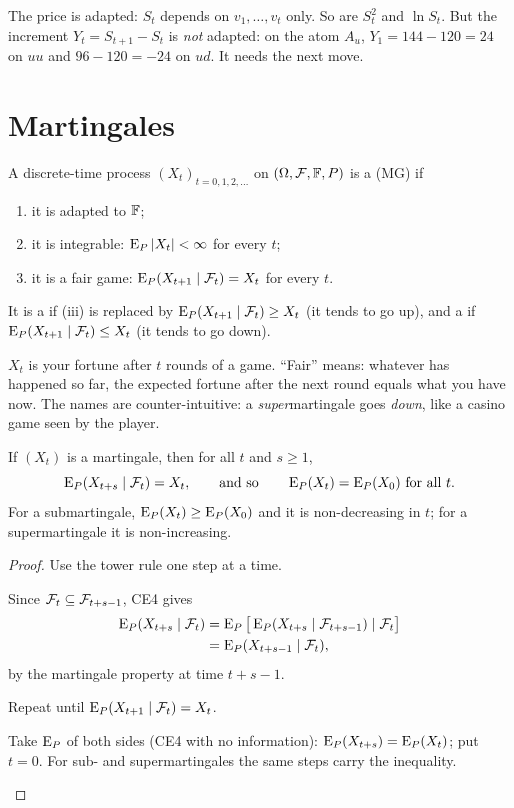The price is adapted: $S_t$ depends on $v_1,\dots,v_t$ only. So are $S_t^2$ and $\ln S_t$. But the increment $Y_t=S_{t+1}-S_t$ is \emph{not} adapted: on the atom $A_u$, $Y_1=144-120=24$ on $uu$ and $96-120=-24$ on $ud$. It needs the next move.

\section{Martingales}

\begin{definition}[Martingale]
\label{def:mg}
A discrete-time process $(X_t)_{t=0,1,2,\dots}$ on $(\Omega,\mathcal F,\mathbb F,P)$ is a  (MG) if
\begin{enumerate}[label=(\roman*)]
  \item it is adapted to $\mathbb F$;
  \item it is integrable: $\operatorname{E}_P|X_t|<\infty$ for every $t$;
  \item it is a fair game: $\operatorname{E}_P(X_{t+1}\mid\mathcal F_t)=X_t$ for every $t$.
\end{enumerate}
It is a  if (iii) is replaced by $\operatorname{E}_P(X_{t+1}\mid\mathcal F_t)\ge X_t$ (it tends to go up), and a  if $\operatorname{E}_P(X_{t+1}\mid\mathcal F_t)\le X_t$ (it tends to go down).
\end{definition}

\begin{intuition}
$X_t$ is your fortune after $t$ rounds of a game. ``Fair'' means: whatever has happened so far, the expected fortune after the next round equals what you have now. The names are counter-intuitive: a \emph{super}martingale goes \emph{down}, like a casino game seen by the player.
\end{intuition}

\begin{theorem}
\label{thm:mg-mean}
If $(X_t)$ is a martingale, then for all $t$ and $s\ge1$,
\[
  \operatorname{E}_P(X_{t+s}\mid\mathcal F_t)=X_t,\qquad\text{and so}\qquad \operatorname{E}_P(X_t)=\operatorname{E}_P(X_0)\ \text{for all }t.
\]
For a submartingale, $\operatorname{E}_P(X_t)\ge\operatorname{E}_P(X_0)$ and it is non-decreasing in $t$; for a supermartingale it is non-increasing.
\end{theorem}
\begin{proof}
Use the tower rule one step at a time.
\begin{steps}
  \item Since $\mathcal F_t\subseteq\mathcal F_{t+s-1}$, CE4 gives
  \[
    \begin{aligned}
    \operatorname{E}_P(X_{t+s}\mid\mathcal F_t)&=\operatorname{E}_P\big[\operatorname{E}_P(X_{t+s}\mid\mathcal F_{t+s-1})\mid\mathcal F_t\big]\\
    &=\operatorname{E}_P(X_{t+s-1}\mid\mathcal F_t),
    \end{aligned}
  \]
  by the martingale property at time $t+s-1$.
  \item Repeat until $\operatorname{E}_P(X_{t+1}\mid\mathcal F_t)=X_t$.
  \item Take $\operatorname{E}_P$ of both sides (CE4 with no information): $\operatorname{E}_P(X_{t+s})=\operatorname{E}_P(X_t)$; put $t=0$. For sub- and supermartingales the same steps carry the inequality. \qedhere
\end{steps}
\end{proof}

